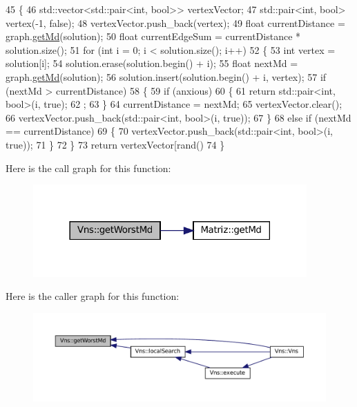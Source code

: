 \begin{DoxyCode}
45 \{
46   std::vector<std::pair<int, bool>> vertexVector;
47   std::pair<int, bool> vertex(-1, \textcolor{keyword}{false});
48   vertexVector.push\_back(vertex);
49   \textcolor{keywordtype}{float} currentDistance = graph.\hyperlink{classMatriz_a8df14a27d791f24206dd633b2a685c5b}{getMd}(solution);
50   \textcolor{keywordtype}{float} currentEdgeSum = currentDistance * solution.size();
51   \textcolor{keywordflow}{for} (\textcolor{keywordtype}{int} i = 0; i < solution.size(); i++)
52   \{
53     \textcolor{keywordtype}{int} vertex = solution[i];
54     solution.erase(solution.begin() + i);
55     \textcolor{keywordtype}{float} nextMd = graph.\hyperlink{classMatriz_a8df14a27d791f24206dd633b2a685c5b}{getMd}(solution);
56     solution.insert(solution.begin() + i, vertex);
57     \textcolor{keywordflow}{if} (nextMd > currentDistance)
58     \{
59       \textcolor{keywordflow}{if} (anxious)
60       \{
61         \textcolor{keywordflow}{return} std::pair<int, bool>(i, \textcolor{keyword}{true});
62         ;
63       \}
64       currentDistance = nextMd;
65       vertexVector.clear();
66       vertexVector.push\_back(std::pair<int, bool>(i, \textcolor{keyword}{true}));
67     \}
68     \textcolor{keywordflow}{else} \textcolor{keywordflow}{if} (nextMd == currentDistance)
69     \{
70       vertexVector.push\_back(std::pair<int, bool>(i, \textcolor{keyword}{true}));
71     \}
72   \}
73   \textcolor{keywordflow}{return} vertexVector[rand() %
74 \}
\end{DoxyCode}
Here is the call graph for this function\+:\nopagebreak
\begin{figure}[H]
\begin{center}
\leavevmode
\includegraphics[width=297pt]{classVns_a2349cd809a0925058a35dea1722c7c23_cgraph}
\end{center}
\end{figure}
Here is the caller graph for this function\+:\nopagebreak
\begin{figure}[H]
\begin{center}
\leavevmode
\includegraphics[width=350pt]{classVns_a2349cd809a0925058a35dea1722c7c23_icgraph}
\end{center}
\end{figure}
\mbox{\label{classVns_aea2dfebed6019c61f7b7405e198d50ab}} 
